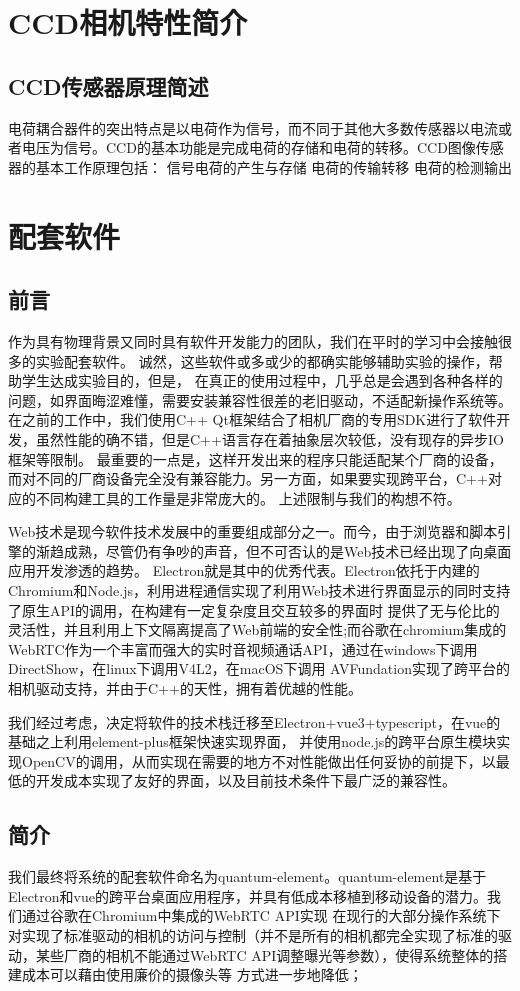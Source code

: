 \documentclass[UTF8]{ctexart}
\begin{document}
\section{CCD相机特性简介}
\subsection{CCD传感器原理简述}
电荷耦合器件的突出特点是以电荷作为信号，而不同于其他大多数传感器以电流或者电压为信号。CCD的基本功能是完成电荷的存储和电荷的转移。CCD图像传感器的基本工作原理包括： 
 信号电荷的产生与存储 
 电荷的传输转移 
 电荷的检测输出 

\section{配套软件} 
\subsection*{前言}
作为具有物理背景又同时具有软件开发能力的团队，我们在平时的学习中会接触很多的实验配套软件。
诚然，这些软件或多或少的都确实能够辅助实验的操作，帮助学生达成实验目的，但是，
在真正的使用过程中，几乎总是会遇到各种各样的问题，如界面晦涩难懂，需要安装兼容性很差的老旧驱动，不适配新操作系统等。
在之前的工作中，我们使用C++ Qt框架结合了相机厂商的专用SDK进行了软件开发，虽然性能的确不错，但是C++语言存在着抽象层次较低，没有现存的异步IO框架等限制。
最重要的一点是，这样开发出来的程序只能适配某个厂商的设备，而对不同的厂商设备完全没有兼容能力。另一方面，如果要实现跨平台，C++对应的不同构建工具的工作量是非常庞大的。
上述限制与我们的构想不符。

Web技术是现今软件技术发展中的重要组成部分之一。而今，由于浏览器和脚本引擎的渐趋成熟，尽管仍有争吵的声音，但不可否认的是Web技术已经出现了向桌面应用开发渗透的趋势。
Electron就是其中的优秀代表。Electron依托于内建的Chromium和Node.js，利用进程通信实现了利用Web技术进行界面显示的同时支持了原生API的调用，在构建有一定复杂度且交互较多的界面时
提供了无与伦比的灵活性，并且利用上下文隔离提高了Web前端的安全性;而谷歌在chromium集成的WebRTC作为一个丰富而强大的实时音视频通话API，通过在windows下调用DirectShow，在linux下调用V4L2，在macOS下调用
AVFundation实现了跨平台的相机驱动支持，并由于C++的天性，拥有着优越的性能。

我们经过考虑，决定将软件的技术栈迁移至Electron+vue3+typescript，在vue的基础之上利用element-plus框架快速实现界面，
并使用node.js的跨平台原生模块实现OpenCV的调用，从而实现在需要的地方不对性能做出任何妥协的前提下，以最低的开发成本实现了友好的界面，以及目前技术条件下最广泛的兼容性。
\subsection{简介}
我们最终将系统的配套软件命名为quantum-element。quantum-element是基于Electron和vue的跨平台桌面应用程序，并具有低成本移植到移动设备的潜力。我们通过谷歌在Chromium中集成的WebRTC API实现
在现行的大部分操作系统下对实现了标准驱动的相机的访问与控制（并不是所有的相机都完全实现了标准的驱动，某些厂商的相机不能通过WebRTC API调整曝光等参数），使得系统整体的搭建成本可以藉由使用廉价的摄像头等
方式进一步地降低；
\end{document}

